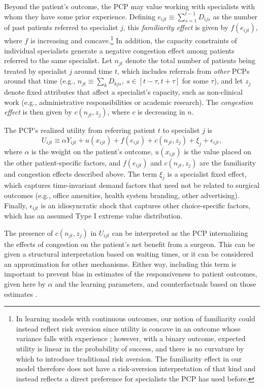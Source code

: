\documentclass[12pt]{article}
\begin{document}
Beyond the patient's outcome, the PCP may value working with specialists with whom they have some prior experience. Defining $e_{ijt} \equiv \sum_{s=1}^{t-1} D_{ijs}$ as the number of past patients referred to specialist $j$, this \emph{familiarity effect} is given by $f(e_{ijt})$, where $f$ is increasing and concave.\footnote{In learning models with continuous outcomes, our notion of familiarity could instead reflect risk aversion since utility is concave in an outcome whose variance falls with experience \citep[e.g.,][]{erdem1996, ching2010}; however, with a binary outcome, expected utility is linear in the probability of success, and there is no curvature by which to introduce traditional risk aversion. The familiarity effect in our model therefore does not have a risk-aversion interpretation of that kind and instead reflects a direct preference for specialists the PCP has used before.} In addition, the capacity constraints of individual specialists generate a negative congestion effect among patients referred to the same specialist. Let $n_{jt}$ denote the total number of patients being treated by specialist $j$ around time $t$, which includes referrals from \emph{other} PCPs around that time (e.g., $n_{jt} \equiv \sum_k D_{kjs}, \ s \in [t - \tau, t + \tau]$ for some $\tau$), and let $z_j$ denote fixed attributes that affect a specialist's capacity, such as non-clinical work (e.g., administrative responsibilities or academic research). The \emph{congestion effect} is then given by $c(n_{jt}, z_j)$, where $c$ is decreasing in $n$.

The PCP's realized utility from referring patient $t$ to specialist $j$ is
\begin{equation}
U_{ijt} \equiv \alpha Y_{ijt} + u(x_{ijt}) + f(e_{ijt}) + c(n_{jt}, z_j) + \xi_j + \epsilon_{ijt},
\label{eqn:pcp_utility}
\end{equation}
where $\alpha$ is the weight on the patient's outcome, $u(x_{ijt})$ is the value placed on the other patient-specific factors, and $f(e_{ijt})$ and $c(n_{jt}, z_j)$ are the familiarity and congestion effects described above. The term $\xi_{j}$ is a specialist fixed effect, which captures time-invariant demand factors that need not be related to surgical outcomes (e.g., office amenities, health system branding, other advertising). Finally, $\epsilon_{ijt}$ is an idiosyncratic shock that captures other choice-specific factors, which has an assumed Type I extreme value distribution.

The presence of $c(n_{jt}, z_j)$ in $U_{ijt}$ can be interpreted as the PCP internalizing the effects of congestion on the patient's net benefit from a surgeon. This can be given a structural interpretation based on waiting times, or it can be considered an approximation for other mechanisms. Either way, including this term is important to prevent bias in estimates of the responsiveness to patient outcomes, given here by $\alpha$ and the learning parameters, and counterfactuals based on those estimates \citep[see][]{richards-shubik2021}.
\end{document}
